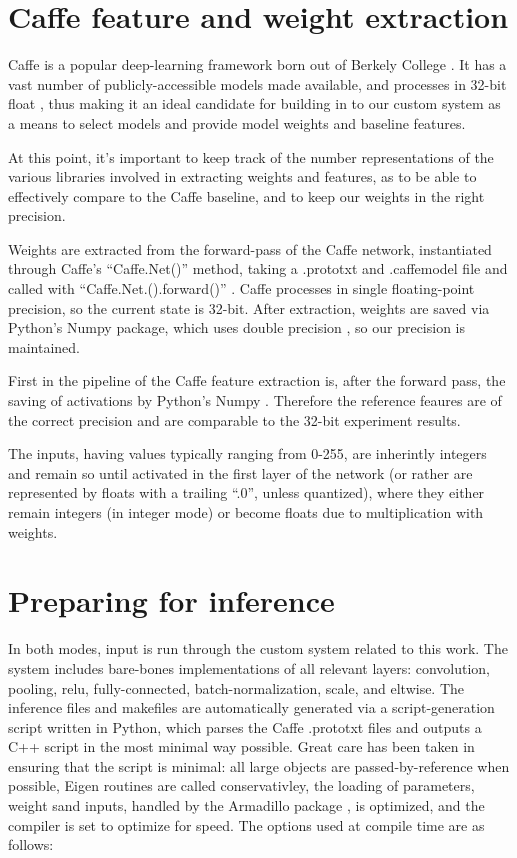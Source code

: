 \section{Caffe feature and weight extraction}
Caffe is a popular deep-learning framework born out of Berkely College \cite{caffe}. It has a vast number of publicly-accessible models made available, and processes in 32-bit float \cite{caffe}, thus making it an ideal candidate for building in to our custom system as a means to select models and provide model weights and baseline features.

At this point, it's important to keep track of the number representations of the various libraries involved in extracting weights and features, as to be able to effectively compare to the Caffe baseline, and to keep our weights in the right precision.

Weights are extracted from the forward-pass of the Caffe network, instantiated through Caffe's ``Caffe.Net()'' method, taking a .prototxt and .caffemodel file and called with ``Caffe.Net.().forward()'' \cite{caffe}. Caffe processes in single floating-point precision, so the current state is 32-bit. After extraction, weights are saved via Python's Numpy package, which uses double precision \cite{scipy}, so our precision is maintained.

First in the pipeline of the Caffe feature extraction is, after the forward pass, the saving of activations by Python's Numpy \cite{scipy}. Therefore the reference feaures are of the correct precision and are comparable to the 32-bit experiment results.

The inputs, having values typically ranging from 0-255, are inherintly integers and remain so until activated in the first layer of the network (or rather are represented by floats with a trailing ``.0'', unless quantized), where they either remain integers (in integer mode) or become floats due to multiplication with weights.

\section{Preparing for inference}
In both modes, input is run through the custom system related to this work. The system includes bare-bones implementations of all relevant layers: convolution, pooling, relu, fully-connected, batch-normalization, scale, and eltwise. The inference files and makefiles are automatically generated via a script-generation script written in Python, which parses the Caffe .prototxt files and outputs a C++ script in the most minimal way possible. Great care has been taken in ensuring that the script is minimal: all large objects are passed-by-reference when possible, Eigen routines are called conservativley, the loading of parameters, weight sand inputs, handled by the Armadillo package \cite{eigen_vs_armadillo}, is optimized, and the compiler is set to optimize for speed. The options used at compile time are as follows: 


